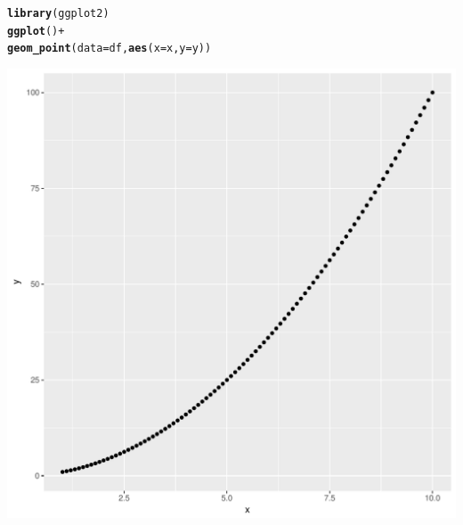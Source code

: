 \documentclass{article}\usepackage[]{graphicx}\usepackage[]{color}
\makeatletter
\def\maxwidth{ %
  \ifdim\Gin@nat@width>\linewidth
    \linewidth
  \else
    \Gin@nat@width
  \fi
}
\newcommand{\hlopt}[1]{\textcolor[rgb]{0,0,0}{#1}}%
\newcommand{\hlstd}[1]{\textcolor[rgb]{0.345,0.345,0.345}{#1}}%
\newcommand{\hlkwc}[1]{\textcolor[rgb]{0.333,0.667,0.333}{#1}}%
\newcommand{\hlkwd}[1]{\textcolor[rgb]{0.737,0.353,0.396}{\textbf{#1}}}%
\newenvironment{kframe}{%
 \def\at@end@of@kframe{}%
 \ifinner\ifhmode%
  \def\at@end@of@kframe{\end{minipage}}%
  \begin{minipage}{\columnwidth}%
 \fi\fi%
 \def\FrameCommand##1{\hskip\@totalleftmargin \hskip-\fboxsep
 \colorbox{shadecolor}{##1}\hskip-\fboxsep
     \hskip-\linewidth \hskip-\@totalleftmargin \hskip\columnwidth}%
 \MakeFramed {\advance\hsize-\width
   \@totalleftmargin\z@ \linewidth\hsize
   \@setminipage}}%
 {\par\unskip\endMakeFramed%
 \at@end@of@kframe}
\newenvironment{knitrout}{}{} %
\makeatother
\begin{document}
\begin{knitrout}
\color{fgcolor}\begin{kframe}
\begin{alltt}
\hlkwd{library}\hlstd{(ggplot2)}
\hlkwd{ggplot}\hlstd{()}\hlopt{+}
  \hlkwd{geom_point}\hlstd{(}\hlkwc{data}\hlstd{=df,}\hlkwd{aes}\hlstd{(}\hlkwc{x}\hlstd{=x,}\hlkwc{y}\hlstd{=y))}
\end{alltt}
\end{kframe}
\includegraphics[width=\maxwidth]{figure/unnamed-chunk-10-1} 

\end{knitrout}
\end{document}
